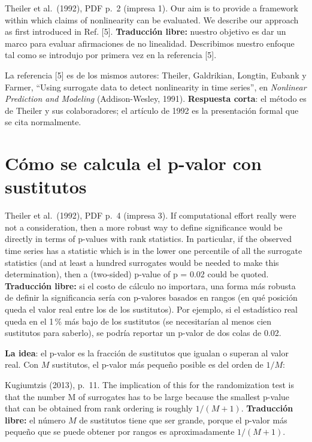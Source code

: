 \documentclass[11pt,openany]{book}
\begin{document}
\begin{cita}{Theiler et al.\ (1992), PDF p.~2 (impresa 1).}
Our aim is to provide a framework within which claims of nonlinearity can be evaluated. We describe our approach as first introduced in Ref. [5].
\tcblower
\textbf{Traducción libre:} nuestro objetivo es dar un marco para evaluar afirmaciones de no linealidad. Describimos nuestro enfoque tal como se introdujo por primera vez en la referencia [5].
\end{cita}

La referencia [5] es de los mismos autores: Theiler, Galdrikian, Longtin, Eubank y Farmer, ``Using surrogate data to detect nonlinearity in time series'', en \emph{Nonlinear Prediction and Modeling} (Addison-Wesley, 1991). \textbf{Respuesta corta}: el método es de Theiler y sus colaboradores; el artículo de 1992 es la presentación formal que se cita normalmente.

\section{Cómo se calcula el p-valor con sustitutos}

\begin{cita}{Theiler et al.\ (1992), PDF p.~4 (impresa 3).}
If computational effort really were not a consideration, then a more robust way to define significance would be directly in terms of p-values with rank statistics. In particular, if the observed time series has a statistic which is in the lower one percentile of all the surrogate statistics (and at least a hundred surrogates would be needed to make this determination), then a (two-sided) p-value of p = 0.02 could be quoted.
\tcblower
\textbf{Traducción libre:} si el costo de cálculo no importara, una forma más robusta de definir la significancia sería con p-valores basados en rangos (en qué posición queda el valor real entre los de los sustitutos). Por ejemplo, si el estadístico real queda en el 1\,\% más bajo de los sustitutos (se necesitarían al menos cien sustitutos para saberlo), se podría reportar un p-valor de dos colas de 0.02.
\end{cita}

\textbf{La idea}: el p-valor es la fracción de sustitutos que igualan o superan al valor real. Con $M$ sustitutos, el p-valor más pequeño posible es del orden de $1/M$:

\begin{cita}{Kugiumtzis (2013), p.~11.}
The implication of this for the randomization test is that the number M of surrogates has to be large because the smallest p-value that can be obtained from rank ordering is roughly $1/(M+1)$.
\tcblower
\textbf{Traducción libre:} el número $M$ de sustitutos tiene que ser grande, porque el p-valor más pequeño que se puede obtener por rangos es aproximadamente $1/(M+1)$.
\end{cita}
\end{document}
